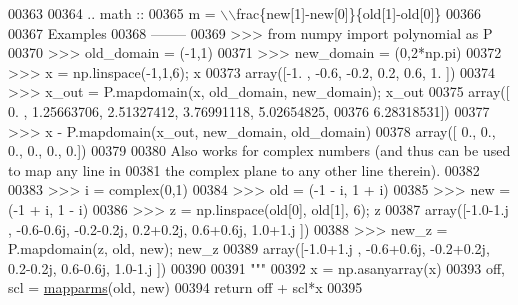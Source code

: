 \begin{DoxyCode}
00363 \textcolor{stringliteral}{}
00364 \textcolor{stringliteral}{    .. math ::}
00365 \textcolor{stringliteral}{        m = \(\backslash\)\(\backslash\)frac\{new[1]-new[0]\}\{old[1]-old[0]\}}
00366 \textcolor{stringliteral}{}
00367 \textcolor{stringliteral}{    Examples}
00368 \textcolor{stringliteral}{    --------}
00369 \textcolor{stringliteral}{    >>> from numpy import polynomial as P}
00370 \textcolor{stringliteral}{    >>> old\_domain = (-1,1)}
00371 \textcolor{stringliteral}{    >>> new\_domain = (0,2*np.pi)}
00372 \textcolor{stringliteral}{    >>> x = np.linspace(-1,1,6); x}
00373 \textcolor{stringliteral}{    array([-1. , -0.6, -0.2,  0.2,  0.6,  1. ])}
00374 \textcolor{stringliteral}{    >>> x\_out = P.mapdomain(x, old\_domain, new\_domain); x\_out}
00375 \textcolor{stringliteral}{    array([ 0.        ,  1.25663706,  2.51327412,  3.76991118,  5.02654825,}
00376 \textcolor{stringliteral}{            6.28318531])}
00377 \textcolor{stringliteral}{    >>> x - P.mapdomain(x\_out, new\_domain, old\_domain)}
00378 \textcolor{stringliteral}{    array([ 0.,  0.,  0.,  0.,  0.,  0.])}
00379 \textcolor{stringliteral}{}
00380 \textcolor{stringliteral}{    Also works for complex numbers (and thus can be used to map any line in}
00381 \textcolor{stringliteral}{    the complex plane to any other line therein).}
00382 \textcolor{stringliteral}{}
00383 \textcolor{stringliteral}{    >>> i = complex(0,1)}
00384 \textcolor{stringliteral}{    >>> old = (-1 - i, 1 + i)}
00385 \textcolor{stringliteral}{    >>> new = (-1 + i, 1 - i)}
00386 \textcolor{stringliteral}{    >>> z = np.linspace(old[0], old[1], 6); z}
00387 \textcolor{stringliteral}{    array([-1.0-1.j , -0.6-0.6j, -0.2-0.2j,  0.2+0.2j,  0.6+0.6j,  1.0+1.j ])}
00388 \textcolor{stringliteral}{    >>> new\_z = P.mapdomain(z, old, new); new\_z}
00389 \textcolor{stringliteral}{    array([-1.0+1.j , -0.6+0.6j, -0.2+0.2j,  0.2-0.2j,  0.6-0.6j,  1.0-1.j ])}
00390 \textcolor{stringliteral}{}
00391 \textcolor{stringliteral}{    """}
00392     x = np.asanyarray(x)
00393     off, scl = \hyperlink{namespacepyneb_1_1utils_1_1polyutils_a3621b172891db0806163f72f22e3723b}{mapparms}(old, new)
00394     \textcolor{keywordflow}{return} off + scl*x
00395 \end{DoxyCode}
\hypertarget{namespacepyneb_1_1utils_1_1polyutils_a3621b172891db0806163f72f22e3723b}{}
